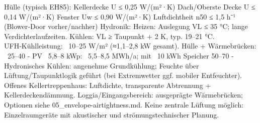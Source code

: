 {}\markdownRendererUlBeginTight
\markdownRendererUlItem Hülle (typisch EH85):\markdownRendererUlItemEnd 
\markdownRendererUlItem Kellerdecke U ≤ 0,25 W/(m²·K)\markdownRendererUlItemEnd 
\markdownRendererUlItem Dach/Oberste Decke U ≤ 0,14 W/(m²·K)\markdownRendererUlItemEnd 
\markdownRendererUlItem Fenster Uw ≤ 0,90 W/(m²·K)\markdownRendererUlItemEnd 
\markdownRendererUlItem Luftdichtheit n50 ≤ 1,5 h⁻¹ (Blower‑Door vorher/nachher)\markdownRendererUlItemEnd 
\markdownRendererUlItem Hydronik:\markdownRendererUlItemEnd 
\markdownRendererUlItem Heizen: Auslegung VL ≤ 35 °C; lange Verdichterlaufzeiten.\markdownRendererUlItemEnd 
\markdownRendererUlItem Kühlen: VL ≥ Taupunkt + 2 K, typ. 19–21 °C.\markdownRendererUlItemEnd 
\markdownRendererUlItem UFH‑Kühlleistung: ~10–25 W/m² (≈1,1–2,8 kW gesamt).\markdownRendererUlItemEnd 
\markdownRendererUlEndTight \markdownRendererInterblockSeparator
{}
\markdownRendererSectionEnd \markdownRendererSectionBegin
{}\markdownRendererInterblockSeparator
{}\markdownRendererUlBeginTight
\markdownRendererUlItem Hülle + Wärmebrücken: ~25–40 - PV ~5,8–8 kWp: ~5,5–8,5 MWh/a; mit ~10 kWh Speicher 50–70 - Hydronisches Kühlen: angenehme Grundkühlung; Feuchte über Lüftung/Taupunktlogik geführt (bei Extremwetter ggf. mobiler Entfeuchter).\markdownRendererUlItemEnd 
\markdownRendererUlEndTight \markdownRendererInterblockSeparator
{}
\markdownRendererSectionEnd \markdownRendererSectionBegin
{}\markdownRendererInterblockSeparator
{}\markdownRendererUlBeginTight
\markdownRendererUlItem Offenes Kellertreppenhaus: Luftdichte, transparente Abtrennung + Kellerdeckendämmung.\markdownRendererUlItemEnd 
\markdownRendererUlItem Loggia/Eingangsbereich: ausgeprägte Wärmebrücken; Optionen siehe 05_envelope-airtightness.md.\markdownRendererUlItemEnd 
\markdownRendererUlItem Keine zentrale Lüftung möglich: Einzelraumgeräte mit akustischer und strömungstechnischer Planung.\markdownRendererUlItemEnd 
\markdownRendererUlEndTight 
\markdownRendererSectionEnd 
\markdownRendererSectionEnd \markdownRendererDocumentEnd